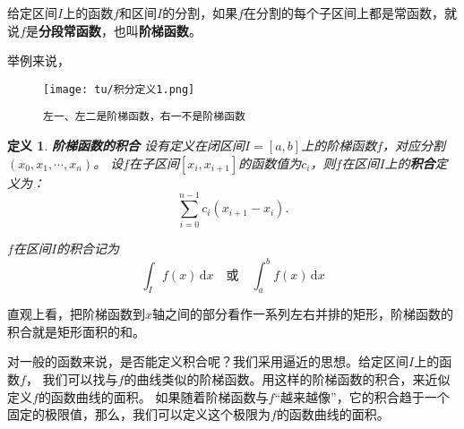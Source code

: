 \documentclass[12pt,UTF8]{ctexbook}
\newcommand{\di}[1]{\,\mathrm{d}#1}
\newtheorem{df}{定义}[section]
\begin{document}
给定区间$I$上的函数$f$和区间$I$的分割，如果$f$在分割的每个子区间上都是常函数，就说$f$是\textbf{分段常函数}，也叫\textbf{阶梯函数}。

举例来说，

\begin{figure}[h] %
    \vspace{4pt}
    \centering
    \texttt{[image: tu/积分定义1.png]} %
    \caption*{\texttt{左一、左二是阶梯函数，右一不是阶梯函数}}
\end{figure}

\begin{df}{\textbf{阶梯函数的积合}}
    设有定义在闭区间$I=[a, b]$上的阶梯函数$f$，对应分割$(x_0, x_1, \cdots , x_n)$。
    设$f$在子区间$[x_i, x_{i+1}]$的函数值为$c_i$，则$f$在区间$I$上的\textbf{积合}定义为：
    $$ \sum_{i=0}^{n-1} c_i(x_{i+1} - x_i).$$
    
    $f$在区间$I$的积合记为
    $$ \int_I f(x)\di{x} \quad \mbox{或} \quad \int_a^b f(x)\di{x} $$
\end{df}

直观上看，把阶梯函数到$x$轴之间的部分看作一系列左右并排的矩形，阶梯函数的积合就是矩形面积的和。

对一般的函数来说，是否能定义积合呢？我们采用逼近的思想。给定区间$I$上的函数$f$，
我们可以找与$f$的曲线类似的阶梯函数。用这样的阶梯函数的积合，来近似定义$f$的函数曲线的面积。
如果随着阶梯函数与$f$“越来越像”，它的积合趋于一个固定的极限值，那么，我们可以定义这个极限为$f$的函数曲线的面积。







\end{document}
